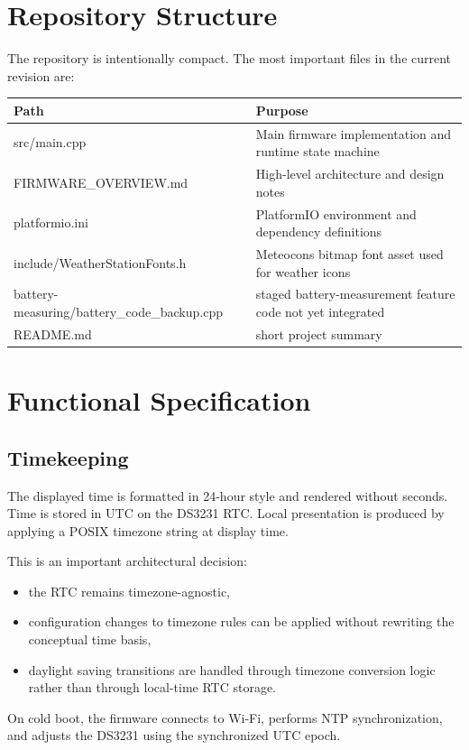 \documentclass[11pt]{article}
\begin{document}
\section{Repository Structure}
The repository is intentionally compact. The most important files in the current revision are:

\begin{longtable}{>{\ttfamily\raggedright\arraybackslash}p{} >{\raggedright\arraybackslash}p{}}
\toprule
Path & Purpose \\
\midrule
src/main.cpp & Main firmware implementation and runtime state machine \\
FIRMWARE\_OVERVIEW.md & High-level architecture and design notes \\
platformio.ini & PlatformIO environment and dependency definitions \\
include/WeatherStationFonts.h & Meteocons bitmap font asset used for weather icons \\
battery-measuring/battery\_code\_backup.cpp & staged battery-measurement feature code not yet integrated \\
README.md & short project summary \\
\bottomrule
\end{longtable}

\section{Functional Specification}
\subsection{Timekeeping}
The displayed time is formatted in 24-hour style and rendered without seconds. Time is stored in UTC on the DS3231 RTC. Local presentation is produced by applying a POSIX timezone string at display time.

This is an important architectural decision:
\begin{itemize}
  \item the RTC remains timezone-agnostic,
  \item configuration changes to timezone rules can be applied without rewriting the conceptual time basis,
  \item daylight saving transitions are handled through timezone conversion logic rather than through local-time RTC storage.
\end{itemize}

On cold boot, the firmware connects to Wi-Fi, performs NTP synchronization, and adjusts the DS3231 using the synchronized UTC epoch.
\end{document}

